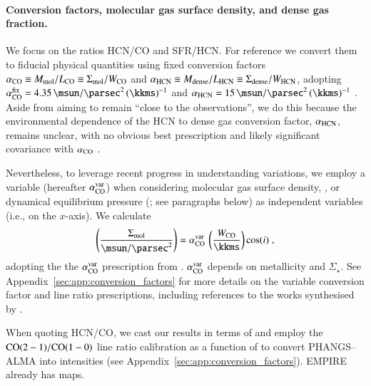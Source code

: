 \documentclass[letter, longauth]{aa} %
\begin{document}
\paragraph{Conversion factors, molecular gas surface density, and dense gas fraction.} 
We focus on the ratios HCN/CO and SFR/HCN. 
For reference we convert them to fiducial physical quantities using fixed conversion factors $\alpha_{\text{CO}}\equiv M_{\text{mol}}/L_{\text{CO}}\equiv\Sigma_{\text{mol}}/W_{\text{CO}}$ and $\alpha_{\text{HCN}}\equiv M_{\text{dense}}/L_{\text{HCN}}\equiv\Sigma_{\text{dense}}/W_{\text{HCN}}$, adopting $\alphaco^{\rm fix}=\SI{4.35}{\msun\per\square\parsec}\,(\SI{}{\kkms})^{-1}$ \citep{Bolatto2013} and $\alphahcn=\SI{15}{\msun\per\square\parsec}\,(\SI{}{\kkms})^{-1}$ \citep{Schinnerer2024}. 
Aside from aiming to remain ``close to the observations'', we do this because the environmental dependence of the HCN to dense gas conversion factor, $\alpha_{\rm HCN}$, remains unclear, with no obvious best prescription and likely significant covariance with $\alpha_{\rm CO}$ \citep[see][]{Usero2015}.

Nevertheless, to leverage recent progress in understanding \alphaco variations, we employ a variable \alphaco (hereafter $\alpha_{\text{CO}}^{\rm var}$) when considering molecular gas surface density, \sigmol, or dynamical equilibrium pressure (\pde; see paragraphs below) as independent variables (i.e., on the $x$-axis). We calculate
\begin{align}
\left(\dfrac{\sigmol}{\SI{}{\msun\per\square\parsec}}\right) = \alphaco^{\rm var}\,\left(\dfrac{\intCO}{\SI{}{\kkms}}\right) \cos(i) \;,
\end{align}
adopting the the $\alpha_{\text{CO}}^{\rm var}$ prescription from \citet{Schinnerer2024}. $\alpha_{\text{CO}}^{\rm var}$ depends on metallicity and $\Sigma_\star$. 
See Appendix~\ref{sec:app:conversion_factors} for more details on the variable conversion factor and line ratio prescriptions, including references to the works synthesised by \citet{Schinnerer2024}.


When quoting HCN/CO, we cast our results in terms of \coone and employ the $\mathrm{CO(2-1)}/\mathrm{CO(1-0)}$ line ratio calibration as a function of \sigsfr to convert PHANGS--ALMA \cotwo into \coone intensities (see Appendix~\ref{sec:app:conversion_factors}). 
EMPIRE already has \coone maps.
\end{document}
